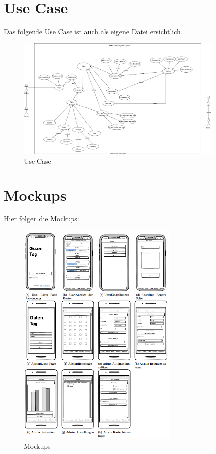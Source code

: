 \section{Use Case}
Das folgende Use Case ist auch als eigene Datei ersichtlich.
\begin{figure}[h]
\centering
\includegraphics[width=0.9\textwidth]{FLUTTER/images/pflichtenheft/use_case.png}
\caption{Use Case}
\end{figure}
\newpage

\section{Mockups}

Hier folgen die Mockups:
\begin{figure}[h]
\centering
\includegraphics[width=0.7\textwidth]{FLUTTER/images/pflichtenheft/mockups.png}
\caption{Mockups}
\end{figure}

